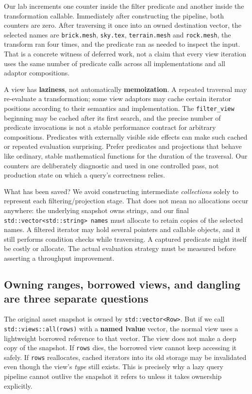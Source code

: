Our lab increments one counter inside the filter predicate and another inside the transformation callable. Immediately after constructing the pipeline, both counters are zero. After traversing it once into an owned destination vector, the selected names are \texttt{brick.mesh}, \texttt{sky.tex}, \texttt{terrain.mesh} and \texttt{rock.mesh}, the transform ran four times, and the predicate ran as needed to inspect the input. That is a concrete witness of deferred work, not a claim that every view iteration uses the same number of predicate calls across all implementations and all adaptor compositions.

A view has \textbf{laziness}, not automatically \textbf{memoization}. A repeated traversal may re-evaluate a transformation; some view adaptors may cache certain iterator positions according to their semantics and implementation. The \texttt{filter\_view} beginning may be cached after its first search, and the precise number of predicate invocations is not a stable performance contract for arbitrary compositions. Predicates with externally visible side effects can make such cached or repeated evaluation surprising. Prefer predicates and projections that behave like ordinary, stable mathematical functions for the duration of the traversal. Our counters are deliberately diagnostic and used in one controlled pass, not production state on which a query's correctness relies.

What has been saved? We avoid constructing intermediate \emph{collections} solely to represent each filtering/projection stage. That does not mean no allocations occur anywhere: the underlying snapshot owns strings, and our final \texttt{std::vector\textless{}std::string\textgreater{}\ names} must allocate to retain copies of the selected names. A filtered iterator may hold several pointers and callable objects, and it still performs condition checks while traversing. A captured predicate might itself be costly or allocate. The actual evaluation strategy must be measured before asserting a throughput improvement.

\subsection{Owning ranges, borrowed views, and dangling are three separate questions}\label{01-foundations-i-ch006-owning-ranges-borrowed-views-and-dangling-are-three-separate-questions}

The original asset snapshot is owned by \texttt{std::vector\textless{}Row\textgreater{}}. But if we call \texttt{std::views::all(rows)} with a \textbf{named lvalue} vector, the normal view uses a lightweight borrowed reference to that vector. The view does not make a deep copy of the snapshot. If \texttt{rows} dies, the borrowed view cannot keep accessing it safely. If \texttt{rows} reallocates, cached iterators into its old storage may be invalidated even though the view's \emph{type} still exists. This is precisely why a lazy query pipeline cannot outlive the snapshot it refers to unless it takes ownership explicitly.

